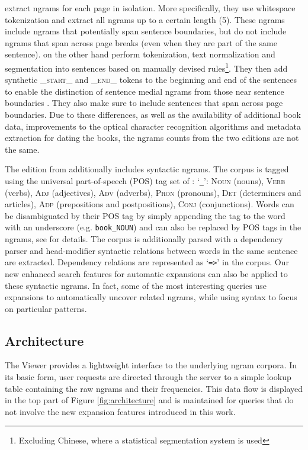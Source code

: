 \documentclass[11pt]{article}
\begin{document}
 extract ngrams for each page in isolation. More specifically, they use whitespace tokenization and extract all ngrams up to a certain length (5). These ngrams include ngrams that potentially span sentence boundaries, but do not include ngrams that span across page breaks (even when they are part of the same sentence).
 on the other hand perform tokenization, text normalization and segmentation into sentences based on manually devised rules\footnote{Excluding Chinese, where a statistical segmentation system is used}. They then add synthetic \textsf{\textsc{\_start\_}} and \textsf{\textsc{\_end\_}} tokens to the beginning and end of the sentences to enable the distinction of sentence medial ngrams from those near sentence boundaries \cite{lin2012syntactic}. They also make sure to include sentences that span across page boundaries. Due to these differences, as well as the availability of additional book data, improvements to the optical character recognition algorithms and metadata extraction for dating the books, the ngrams counts from the two editions are not the same.

The edition from  additionally includes syntactic ngrams. The corpus is tagged using the universal part-of-speech (POS) tag set of : `\texttt{\_}': \textsf{\textsc{Noun}} (nouns), \textsf{\textsc{Verb}} (verbs), \textsf{\textsc{Adj}} (adjectives), \textsf{\textsc{Adv}} (adverbs), \textsf{\textsc{Pron}} (pronouns), \textsf{\textsc{Det}} (determiners and articles), \textsf{\textsc{Adp}} (prepositions and postpositions), \textsf{\textsc{Conj}} (conjunctions). Words can be disambiguated by their POS tag by simply appending the tag to the word with an underscore (e.g. \texttt{book\_NOUN}) and can also be replaced by POS tags in the ngrams, see  for details. The corpus is additionally parsed with a dependency parser and head-modifier syntactic relations between words in the same sentence are extracted. Dependency relations are represented as `\texttt{=>}' in the corpus. Our new enhanced search features for automatic expansions can also be applied to these syntactic ngrams. In fact, some of the most interesting queries use expansions to automatically uncover related ngrams, while using syntax to focus on particular patterns.


\subsection{Architecture}
The Viewer provides a lightweight interface to the underlying ngram corpora. In its basic form, user requests are directed through the server to a simple lookup table containing the raw ngrams and their frequencies. This data flow is displayed in the top part of Figure \ref{fig:architecture} and is maintained for queries that do not involve the new expansion features introduced in this work.
\end{document}
